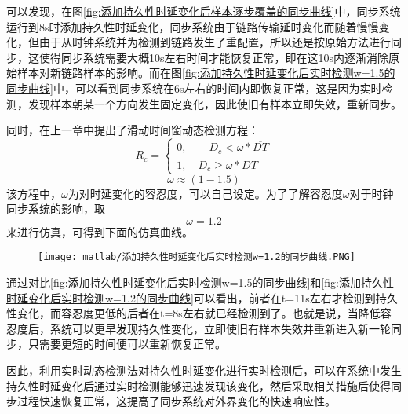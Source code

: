 可以发现，在图\ref{fig:添加持久性时延变化后样本逐步覆盖的同步曲线}中，同步系统运行到8s时添加持久性时延变化，同步系统由于链路传输延时变化而随着慢慢变化，但由于从时钟系统并为检测到链路发生了重配置，所以还是按原始方法进行同步，这使得同步系统需要大概10s左右时间才能恢复正常，即在这10s内逐渐消除原始样本对新链路样本的影响。而在图\ref{fig:添加持久性时延变化后实时检测w=1.5的同步曲线}中，可以看到同步系统在6s左右的时间内即恢复正常，这是因为实时检测，发现样本朝某一个方向发生固定变化，因此使旧有样本立即失效，重新同步。

同时，在上一章中提出了滑动时间窗动态检测方程：
\begin{equation}
R_{c} = \left\{
  \begin{array}{ll} %
    0, \qquad D_{c} < \omega * \overline{DT} \\
    1, \quad D_{c} \geq \omega * \overline{DT} 
  \end{array}
  \right. 
\end{equation}
\begin{equation}
  \omega \approx (1 - 1.5)
\end{equation}
该方程中，$\omega$为对时延变化的容忍度，可以自己设定。为了了解容忍度$\omega$对于时钟同步系统的影响，取
\begin{equation}
  \omega = 1.2
\end{equation}
来进行仿真，可得到下面的仿真曲线。
\begin{figure}[htbp]
  \centering
  \begin{minipage}[b]{1\textwidth}
    \captionstyle{\centering}
    \centering
    \texttt{[image: matlab/添加持久性时延变化后实时检测w=1.2的同步曲线.PNG]}
  \end{minipage}     
\end{figure}

通过对比\ref{fig:添加持久性时延变化后实时检测w=1.5的同步曲线}和\ref{fig:添加持久性时延变化后实时检测w=1.2的同步曲线}可以看出，前者在t=11s左右才检测到持久性变化，而容忍度更低的后者在t=8s左右就已经检测到了。也就是说，当降低容忍度后，系统可以更早发现持久性变化，立即使旧有样本失效并重新进入新一轮同步，只需要更短的时间便可以重新恢复正常。

因此，利用实时动态检测法对持久性时延变化进行实时检测后，可以在系统中发生持久性时延变化后通过实时检测能够迅速发现该变化，然后采取相关措施后使得同步过程快速恢复正常，这提高了同步系统对外界变化的快速响应性。

